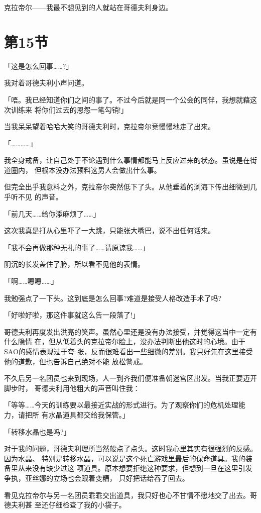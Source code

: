 \documentclass[11pt]{book}
\begin{document}
克拉帝尔——我最不想见到的人就站在哥德夫利身边。
\section{第15节}
\label{sec:org0d783b4}
「这是怎么回事……?」

我对着哥德夫利小声问道。

「唔。我已经知道你们之间的事了。不过今后就是同一个公会的同伴，我想就藉这次训练来
将你们过去的恩怨一笔勾销!」

当我呆呆望着哈哈大笑的哥德夫利时，克拉帝尔竞慢慢地走了出来。

「…………」

我全身戒备，让自己处于不论遇到什么事情都能马上反应过来的状态。虽说是在街道圈内，
但根本没办法预料这男人会做出什么事。

但完全出乎我意料之外，克拉帝尔突然低下了头。从他垂着的浏海下传出细微到几乎听不见
的声音。

「前几天……给你添麻烦了……」

这次我真是打从心里吓了一大跳，只能张大嘴巴，说不出任何话来。

「我不会再做那种无礼的事了……请原谅我……」

阴沉的长发盖住了脸，所以看不见他的表情。

「啊……嗯嗯……」

我勉强点了一下头。这到底是怎么回事?难道是接受人格改造手术了吗?

「好啦好啦，那这件事就这么告一段落了!」

哥德夫利再度发出洪亮的笑声。虽然心里还是没有办法接受，并觉得这当中一定有什么隐情
在，但从低着头的克拉帝尔脸上，没办法判断出他这时的心境。由于SAO的感情表现过于夸
张，反而很难看出一些细微的差别。我只好先在这里接受他的道歉，但也告诉自己绝对不能
放松警戒。

不久后另一名团员也来到现场，人一到齐我们便准备朝迷宫区出发。当我正要迈开脚步时，
哥德夫利用他粗大的声音叫住我：

「等等……今天的训练要以最接近实战的形式进行。为了观察你们的危机处理能力，请把所
有水晶道具都交给我保管。」

「转移水晶也是吗?」

对于我的问题，哥德夫利理所当然般点了点头。这时我心里其实有很强烈的反感。因为水晶、
特别是转移水晶，可以说是这个死亡游戏里最后的保命道具。我的装备里从来没有缺少过这
项道具。原本想要拒绝这种要求，但想到一旦在这里引发争执，亚丝娜的立场也会跟着变糟，
只好把话给吞了回去。

看见克拉帝尔与另一名团员乖乖交出道具，我只好也心不甘情不愿地交了出去。哥德夫利甚
至还仔细检查了我的小袋子。
\end{document}
